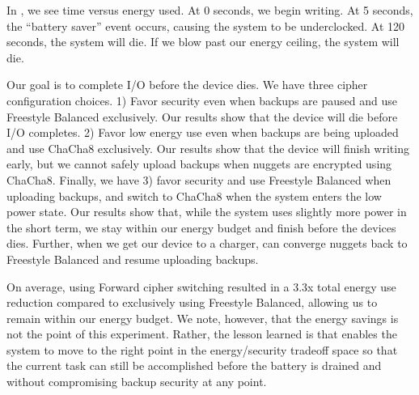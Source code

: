 In , we see time versus energy used. At 0 seconds, we
begin writing. At 5 seconds, the ``battery saver'' event occurs, causing the
system to be underclocked. At 120 seconds, the system will die. If we blow past
our energy ceiling, the system will die.

Our goal is to complete I/O before the device dies. We have three cipher
configuration choices. 1) Favor security even when backups are paused and use
Freestyle Balanced exclusively. Our results show that the device will die before
I/O completes. 2) Favor low energy use even when backups are being uploaded and
use ChaCha8 exclusively. Our results show that the device will finish writing
early, but we cannot safely upload backups when nuggets are encrypted using
ChaCha8. Finally, we have 3) favor security and use Freestyle Balanced when
uploading backups, and switch to ChaCha8 when the system enters the low power
state. Our results show that, while the system uses slightly more power in the
short term, we stay within our energy budget and finish before the devices dies.
Further, when we get our device to a charger, \sys{} can converge nuggets
back to Freestyle Balanced and resume uploading backups.

On average, using Forward cipher switching resulted in a 3.3x total
energy use reduction compared to exclusively using Freestyle Balanced,
allowing us to remain within our energy budget. We note, however, that
the energy savings is not the point of this experiment. Rather, the
lesson learned is that \sys{} enables the system to move to the
right point in the energy/security tradeoff space so that the current
task can still be accomplished before the battery is drained and
without compromising backup security at any point.  

